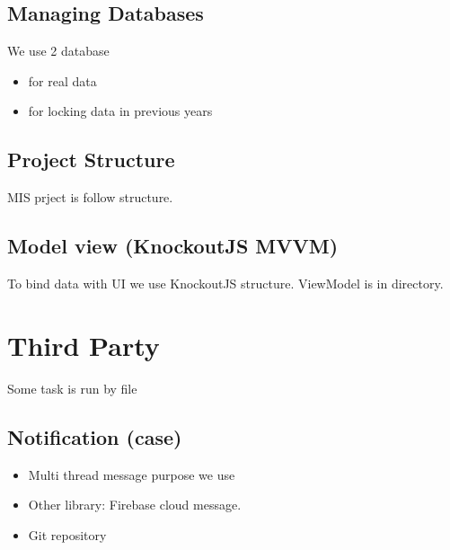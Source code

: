 \documentclass[letterpaper,10pt,english,openany,oneside]{sphinxmanual}
\begin{document}
\section{Managing Databases}
\label{\detokenize{technology/technology:managing-databases}}
\sphinxAtStartPar
We use 2 database
\begin{itemize}
\item {} 
\sphinxAtStartPar
{} for real data

\item {} 
\sphinxAtStartPar
{} for locking data in previous years

\end{itemize}


\section{Project Structure}
\label{\detokenize{technology/technology:project-structure}}
\sphinxAtStartPar
MIS prject is follow  structure.


\section{Model view (KnockoutJS \sphinxhyphen{} MVVM)}
\label{\detokenize{technology/technology:model-view-knockoutjs-mvvm}}
\sphinxAtStartPar
To bind data with UI we use KnockoutJS  structure. ViewModel is in  directory.


\chapter{Third Party}
\label{\detokenize{Third Party/data-export-tool:third-party}}\label{\detokenize{Third Party/data-export-tool::doc}}
\sphinxAtStartPar
Some task is run by  file


\section{Notification (case)}
\label{\detokenize{Third Party/data-export-tool:notification-case}}\begin{itemize}
\item {} 
\sphinxAtStartPar
Multi thread message purpose we use 

\item {} 
\sphinxAtStartPar
Other library: Firebase cloud message.

\item {} 
\sphinxAtStartPar
Git repository 

\end{itemize}
\end{document}
